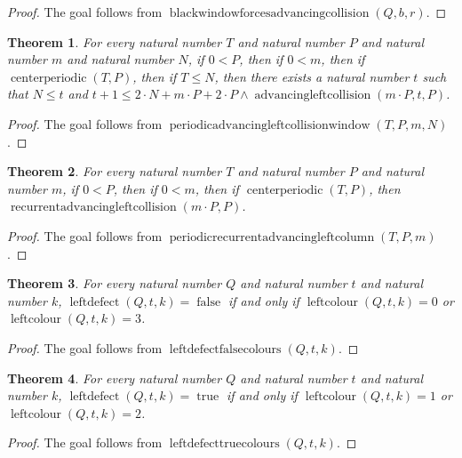 \documentclass[11pt]{article}
\newtheorem{theorem}{Theorem}[section]
\theoremstyle{definition}
\begin{document}
\begin{proof}
The goal follows from \(\operatorname{blackwindowforcesadvancingcollision}(Q, b, r)\).
\end{proof}
\begin{theorem}
\label{ll:observations:periodic-advancing-left-collision-window}
For every natural number \(T\) and natural number \(P\) and natural number \(m\) and natural number \(N\), if \(0 < P\), then if \(0 < m\), then if \(\operatorname{centerperiodic}(T, P)\), then if \(T \le N\), then there exists a natural number \(t\) such that \(N \le t\) and \(t + 1 \le 2 \cdot N + m \cdot P + 2 \cdot P \land \operatorname{advancingleftcollision}(m \cdot P, t, P)\).
\end{theorem}
\begin{proof}
The goal follows from \(\operatorname{periodicadvancingleftcollisionwindow}(T, P, m, N)\).
\end{proof}
\begin{theorem}
\label{ll:observations:periodic-recurrent-advancing-left-column}
For every natural number \(T\) and natural number \(P\) and natural number \(m\), if \(0 < P\), then if \(0 < m\), then if \(\operatorname{centerperiodic}(T, P)\), then \(\operatorname{recurrentadvancingleftcollision}(m \cdot P, P)\).
\end{theorem}
\begin{proof}
The goal follows from \(\operatorname{periodicrecurrentadvancingleftcolumn}(T, P, m)\).
\end{proof}
\begin{theorem}
\label{ll:observations:left-defect-false-colours}
For every natural number \(Q\) and natural number \(t\) and natural number \(k\), \(\operatorname{leftdefect}(Q, t, k) = \operatorname{false}\) if and only if \(\operatorname{leftcolour}(Q, t, k) = 0\) or \(\operatorname{leftcolour}(Q, t, k) = 3\).
\end{theorem}
\begin{proof}
The goal follows from \(\operatorname{leftdefectfalsecolours}(Q, t, k)\).
\end{proof}
\begin{theorem}
\label{ll:observations:left-defect-true-colours}
For every natural number \(Q\) and natural number \(t\) and natural number \(k\), \(\operatorname{leftdefect}(Q, t, k) = \operatorname{true}\) if and only if \(\operatorname{leftcolour}(Q, t, k) = 1\) or \(\operatorname{leftcolour}(Q, t, k) = 2\).
\end{theorem}
\begin{proof}
The goal follows from \(\operatorname{leftdefecttruecolours}(Q, t, k)\).
\end{proof}
\end{document}
